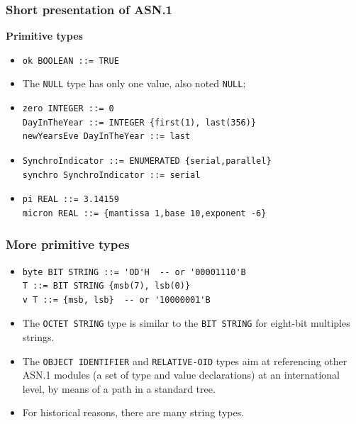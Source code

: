 \documentclass[compress,dvips,xcolor={dvipsnames},t]{beamer}
\newcommand\ASN{\textsf{ASN.1}\xspace}
\begin{document}
\begin{frame}[containsverbatim]
\frametitle{Short presentation of \ASN}

\noindent
\textbf{Primitive types}
\begin{itemize}

  \item \verb+ok BOOLEAN ::= TRUE+

  \item The \texttt{NULL} type has only one value, also noted
        \texttt{NULL};

  \item

\begin{verbatim}
zero INTEGER ::= 0
DayInTheYear ::= INTEGER {first(1), last(356)}
newYearsEve DayInTheYear ::= last
\end{verbatim}

  \item
\begin{verbatim}
SynchroIndicator ::= ENUMERATED {serial,parallel}
synchro SynchroIndicator ::= serial
\end{verbatim}

  \item

\begin{verbatim}
pi REAL ::= 3.14159
micron REAL ::= {mantissa 1,base 10,exponent -6}
\end{verbatim}

\end{itemize}

\end{frame}

\begin{frame}[containsverbatim]
\frametitle{More primitive types}

\begin{itemize}

  \item
\begin{verbatim}
byte BIT STRING ::= 'OD'H  -- or '00001110'B
T ::= BIT STRING {msb(7), lsb(0)}
v T ::= {msb, lsb}  -- or '10000001'B
\end{verbatim}

 \item The \texttt{OCTET STRING} type is similar to the \texttt{BIT
       STRING} for eight-bit multiples strings.

 \item The \texttt{OBJECT IDENTIFIER} and \texttt{RELATIVE-OID} types
       aim at referencing other \ASN modules (a set of type
       and value declarations) at an international level, by means of
       a path in a standard tree.

  \item For historical reasons, there are many string types.

\end{itemize}

\end{frame}
\end{document}
